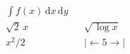 \documentclass[nofonts]{ctexart}
\begin{document}
\begin{align*}
	& \int f(x)\,\mathrm{d}x\,\mathrm{d}y	\\
	& \sqrt{2}\,x && \sqrt{\,\log{x}}	\\
	& x^2 \! /2   && |\!{\gets} 5 {\to}\!|
\end{align*}
\end{document}
